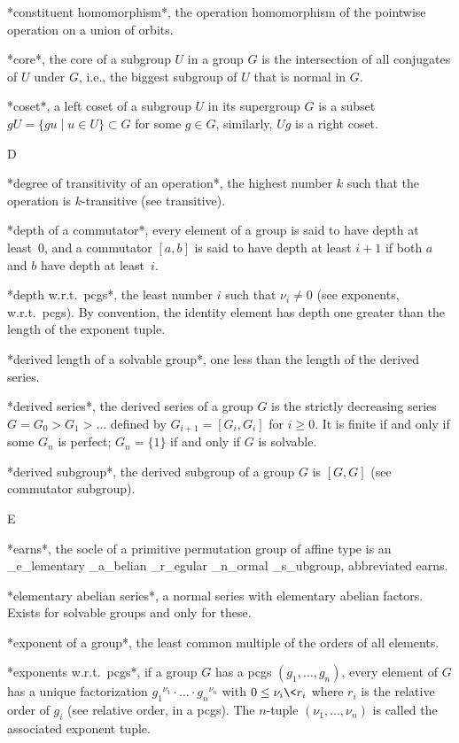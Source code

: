 *constituent homomorphism*,  the operation homomorphism of  the pointwise
operation on a union of orbits.

*core*, the core of a subgroup $U$ in a group  $G$ is the intersection of
all conjugates of $U$  under $G$, i.e., the biggest  subgroup of $U$ that
is normal in $G$.

*coset*, a left coset of a subgroup $U$ in its supergroup $G$ is a subset
$gU = \{gu\mid u\in U\}\subset G$ for some $g\in G$, similarly, $Ug$ is a
right coset.

 D

*degree  of transitivity  of an  operation*, the  highest number $k$ such
that the operation is $k$-transitive (see transitive).

*depth of a commutator*, every element of  a group is  said to have depth
at least~0, and a commutator $[a,b]$ is said to have depth at least $i+1$
if both $a$ and $b$ have depth at least~$i$.

*depth w.r.t.~pcgs*,  the least number  $i$  such that  $\nu_i\ne 0$ (see
exponents,  w.r.t.~pcgs). By  convention, the identity  element has depth
one greater than the length of the exponent tuple.

*derived length  of a solvable  group*, one  less than the  length of the
derived series.

*derived series*,  the derived  series  of a  group  $G$ is  the strictly
decreasing  series $G  = G_0   > G_1 >   \ldots$ defined   by $G_{i+1}  =
[G_i,G_i]$ for   $i\ge 0$. It  is  finite if and  only  if some  $G_n$ is
perfect; $G_n=\{1\}$ if and only if $G$ is solvable.

*derived subgroup*, the derived subgroup  of a group  $G$ is $[G,G]$ (see
commutator subgroup).

 E

*earns*, the socle of a primitive permutation group  of affine type is an
_e_lementary _a_belian _r_egular _n_ormal _s_ubgroup, abbreviated earns.

*elementary abelian  series*,   a normal series  with elementary  abelian
factors. Exists for solvable groups and only for these.

*exponent of  a group*, the least  common  multiple of the orders  of all
elements.

*exponents w.r.t.~pcgs*, if a  group $G$  has a pcgs  $(g_1,\ldots,g_n)$,
every   element of $G$  has  a  unique factorization  ${g_1}^{\nu_1}\cdot
\ldots \cdot {g_n}^{\nu_n}$  with $0\le \nu_i \< r_i$  where $r_i$ is the
relative order  of $g_i$ (see relative  order, in  a pcgs). The $n$-tuple
$(\nu_1,\ldots,\nu_n)$ is called the associated exponent tuple.

